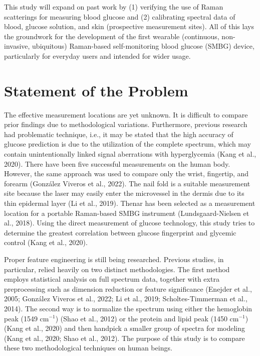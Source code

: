 This study will expand on past work by (1) verifying the use of Raman scatterings for measuring blood glucose and (2) calibrating spectral data of blood, glucose solution, and skin (prospective measurement sites). 
All of this lays the groundwork for the development of the first wearable (continuous, non-invasive, ubiquitous) Raman-based self-monitoring blood glucose (SMBG) device, particularly for everyday users and intended for wider usage.


\section{Statement of the Problem}

The effective measurement locations are yet unknown. 
It is difficult to compare prior findings due to methodological variations. 
Furthermore, previous research had problematic technique, i.e., it may be stated that the high accuracy of glucose prediction is due to the utilization of the complete spectrum, which may contain unintentionally linked signal aberrations with hyperglycemia (Kang et al., 2020). 
There have been five successful measurements on the human body. 
However, the same approach was used to compare only the wrist, fingertip, and forearm (González Viveros et al., 2022). 
The nail fold is a suitable measurement site because the laser may easily enter the microvessel in the dermis due to its thin epidermal layer (Li et al., 2019). 
Thenar has been selected as a measurement location for a portable Raman-based SMBG instrument (Lundsgaard-Nielsen et al., 2018). 
Using the direct measurement of glucose technology, this study tries to determine the greatest correlation between glucose fingerprint and glycemic control (Kang et al., 2020).

Proper feature engineering is still being researched. 
Previous studies, in particular, relied heavily on two distinct methodologies. 
The first method employs statistical analysis on full spectrum data, together with extra preprocessing such as dimension reduction or feature significance (Enejder et al., 2005; González Viveros et al., 2022; Li et al., 2019; Scholtes-Timmerman et al., 2014). 
The second way is to normalize the spectrum using either the hemoglobin peak (1549 $\text{cm}^{-1}$) (Shao et al., 2012) or the protein and lipid peak (1450 $\text{cm}^{-1}$) (Kang et al., 2020) and then handpick a smaller group of spectra for modeling (Kang et al., 2020; Shao et al., 2012). 
The purpose of this study is to compare these two methodological techniques on human beings.

